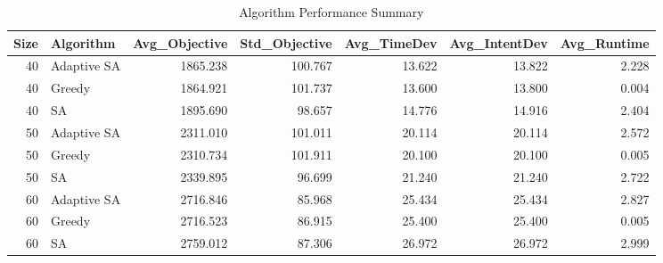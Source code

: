 \begin{table}
\caption{Algorithm Performance Summary}
\label{tab:algorithm_performance_summary}
\begin{tabular}{rlrrrrr}
\toprule
Size & Algorithm & Avg_Objective & Std_Objective & Avg_TimeDev & Avg_IntentDev & Avg_Runtime \\
\midrule
40 & Adaptive SA & 1865.238 & 100.767 & 13.622 & 13.822 & 2.228 \\
40 & Greedy & 1864.921 & 101.737 & 13.600 & 13.800 & 0.004 \\
40 & SA & 1895.690 & 98.657 & 14.776 & 14.916 & 2.404 \\
50 & Adaptive SA & 2311.010 & 101.011 & 20.114 & 20.114 & 2.572 \\
50 & Greedy & 2310.734 & 101.911 & 20.100 & 20.100 & 0.005 \\
50 & SA & 2339.895 & 96.699 & 21.240 & 21.240 & 2.722 \\
60 & Adaptive SA & 2716.846 & 85.968 & 25.434 & 25.434 & 2.827 \\
60 & Greedy & 2716.523 & 86.915 & 25.400 & 25.400 & 0.005 \\
60 & SA & 2759.012 & 87.306 & 26.972 & 26.972 & 2.999 \\
\bottomrule
\end{tabular}
\end{table}
